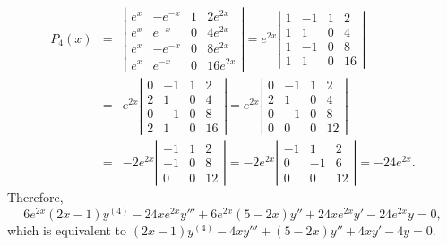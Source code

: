 \documentclass[dvips]{book}
\renewcommand{\exer}[1]{\par\medskip\;\noindent{\color{red}\bf #1.}}
\numberwithin{example}{section}
\numberwithin{equation}{section}
\numberwithin{theorem}{section}
\numberwithin{table}{section}
\numberwithin{figure}{section}
\begin{document}
\begin{eqnarray*}
P_4(x)&=&
\left|\begin{array}{cccc}
e^x&-e^{-x}&1&2e^{2x}\\
e^x&e^{-x}&0&4e^{2x}\\
e^x&-e^{-x}&0&8e^{2x}\\
e^x&e^{-x}&0&16e^{2x}
\end{array}\right|=
e^{2x}\left|\begin{array}{crcc}
1&-1&1&2\\
1&1&0&4\\
1&-1&0&8\\
1&1&0&16
\end{array}\right|\\
&=&e^{2x}\left|\begin{array}{crcc}
0&-1&1&2\\
2&1&0&4\\
0&-1&0&8\\
2&1&0&16
\end{array}\right|
=e^{2x}\left|\begin{array}{crcc}
0&-1&1&2\\
2&1&0&4\\
0&-1&0&8\\
0&0&0&12
\end{array}\right|\\
&=&-2e^{2x}\left|\begin{array}{rcc}
-1&1&2\\
-1&0&8\\
0&0&12
\end{array}\right|
=-2e^{2x}\left|\begin{array}{rcc}
-1&1&2\\
0&-1&6\\
0&0&12
\end{array}\right|=-24e^{2x}.
\end{eqnarray*}
Therefore,
$$
6e^{2x}(2x-1)y^{(4)}-24xe^{2x}y'''
+6e^{2x}(5-2x)y''+24xe^{2x}y'-24e^{2x}y=0,
$$
which is equivalent to
 $(2x-1)y^{(4)}-4xy'''+(5-2x)y''+4xy'-4y=0$.

\exer{9.1.24}
\end{document}
